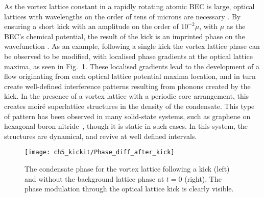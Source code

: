 As the vortex lattice constant in a rapidly rotating atomic BEC is large, optical lattices with wavelengths on the order of tens of microns are necessary \cite{BEC:Fallani_optexp_2005, AO:Williams_optexp_2008}. By ensuring a short kick with an amplitude on the order of $10^{-2} \mu $, with $\mu$ as the BEC's chemical potential, the result of the kick is an imprinted phase on the wavefunction \cite{Vtx:Dobrek_pra_1999}. As an example, following a single kick the vortex lattice phase can be observed to be modified, with localised phase gradients at the optical lattice maxima, as seen in Fig.~\ref{fig:Phase_diff_after_kick}. These localised gradients lead to the development of a flow originating from each optical lattice potential maxima location, and in turn create well-defined interference patterns resulting from phonons created by the kick. In the presence of a vortex lattice with a periodic core arrangement, this creates moir\'e superlattice structures \cite{SS:Murata_acsn_2010} in the density of the condensate. This type of pattern has been observed in many solid-state systems, such as graphene on hexagonal boron nitride~\cite{SS:Yankowitz_natphys_2012}, though it is static in such cases. In this system, the structures are dynamical, and revive at well defined intervals.

\begin{figure}
    \centering
    \texttt{[image: ch5\_kickit/Phase\_diff\_after\_kick]}
    \caption[Phase modulation following a kick.]{The condensate phase for the vortex lattice following a kick (left) and without the background lattice phase at $t=0$ (right). The phase modulation through the optical lattice kick is clearly visible.}
    \label{fig:Phase_diff_after_kick}
\end{figure}


